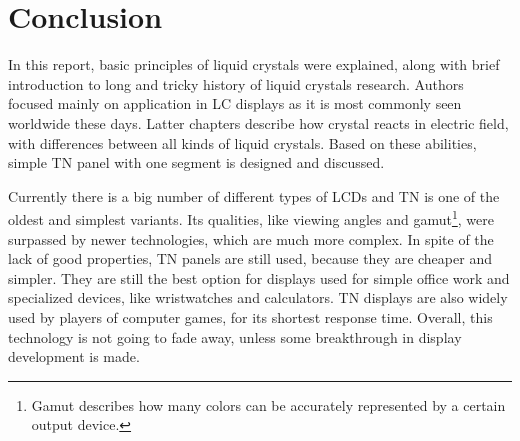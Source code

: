 \section{Conclusion}
\label{sec:conclusion}

In this report, basic principles of liquid crystals were explained, along with brief introduction to long and tricky history of liquid crystals research. Authors focused mainly on application in LC displays as it is most commonly seen worldwide these days. Latter chapters describe how crystal reacts in electric field, with differences between all kinds of liquid crystals. Based on these abilities, simple TN panel with one segment is designed and discussed.

Currently there is a big number of different types of LCDs and TN is one of the oldest and simplest variants. Its qualities, like viewing angles and gamut\footnote{Gamut describes how many colors can be accurately represented by a certain output device.}, were surpassed by newer technologies, which are much more complex. In spite of the lack of good properties, TN panels are still used, because they are cheaper and simpler. They are still the best option for displays used for simple office work and specialized devices, like wristwatches and calculators. TN displays are also widely used by players of computer games, for its shortest response time. Overall, this technology is not going to fade away, unless some breakthrough in display development is made.